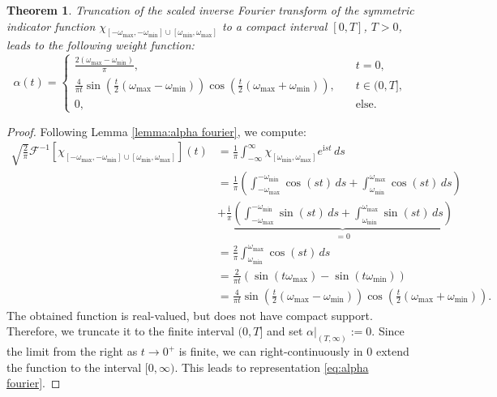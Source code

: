 \documentclass[a4paper,11pt,bibliography=totoc,listof=totoc,headinclude=true,cleardoublepage=empty,oneside]{scrbook}
\newtheorem{theorem}{Theorem}[chapter]
\renewcommand{\i}{\mathrm{i}}
\newcommand{\F}{\mathcal{F}}
\begin{document}
\begin{theorem}
    Truncation of the scaled inverse Fourier transform of the symmetric indicator function $\chi_{\left[-\omega_{\max}, -\omega_{\min}\right]\cup\left[\omega_{\min}, \omega_{\max}\right]}$ to a compact interval $[0, T]$, $T>0$, leads to the following weight function:
    \begin{equation}\label{eq:alpha fourier}
        \alpha(t) = \begin{cases}
            \frac{2\left(\omega_{\max} - \omega_{\min}\right)}{\pi}, \quad & t = 0, \\
            \frac{4}{\pi t} \sin\left(\frac{t}{2}\left(\omega_{\max}-\omega_{\min} \right)\right)\cos\left(\frac{t}{2}\left(\omega_{\max}+\omega_{\min} \right)\right), \quad & t \in (0, T], \\
            0, \quad & \text{else.}
        \end{cases}
    \end{equation}
\end{theorem}
\begin{proof}
    Following Lemma \ref{lemma:alpha fourier}, we compute:
    \begin{align*}
        \sqrt{\frac{2}{\pi}} \F^{-1}\left[\chi_{\left[-\omega_{\max}, -\omega_{\min}\right]\cup\left[\omega_{\min}, \omega_{\max}\right]}\right](t) &= \frac{1}{\pi} \int_{-\infty}^\infty \chi_{\left[\omega_{\min}, \omega_{\max}\right]} e^{\i st} \, ds \\ 
        & = \frac{1}{\pi} \left( \int_{-\omega_{\max}}^{-\omega_{\min}} \cos(st) \, ds + \int_{\omega_{\min}}^{\omega_{\max}} \cos(st) \, ds\right) \\ &+ \frac{\i}{\pi} \underbrace{\left(\int_{-\omega_{\max}}^{-\omega_{\min}} \sin(st) \, ds + \int_{\omega_{\min}}^{\omega_{\max}} \sin(st) \, ds \right)}_{=0} \\
        &= \frac{2}{\pi}\int_{\omega_{\min}}^{\omega_{\max}} \cos(st) \, ds \\
        &= \frac{2}{\pi t} \left(\sin\left(t\omega_{\max}\right) - \sin\left(t\omega_{\min}\right)\right) \\
        &= \frac{4}{\pi t} \sin\left(\frac{t}{2}\left(\omega_{\max}-\omega_{\min} \right)\right)\cos\left(\frac{t}{2}\left(\omega_{\max}+\omega_{\min} \right)\right).
    \end{align*}
    The obtained function is real-valued, but does not have compact support. Therefore, we truncate it to the finite interval $(0, T]$ and set $\alpha|_{(T, \infty)} := 0$. Since the limit from the right as $t\rightarrow 0^+$ is finite, we can right-continuously in 0 extend the function to the interval $[0, \infty)$. This leads to representation \eqref{eq:alpha fourier}.
\end{proof}
\end{document}

